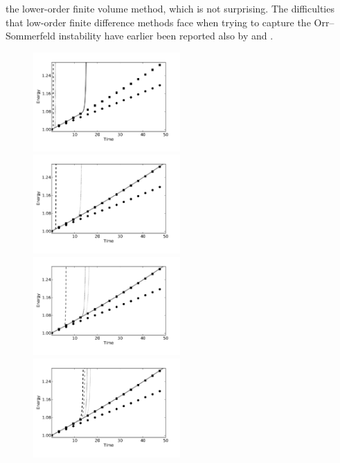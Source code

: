 the lower-order finite volume method, which is not surprising. The
difficulties that low-order finite difference methods face when trying
to capture the Orr--Sommerfeld instability have earlier been reported
also by \citet{MalikZangHussaini1984} and \citet{CanutoHussainiQuarteroniEtAl2007}.
\begin{figure}
\includegraphics[width=0.5\textwidth]{chapters/mortensen/pdf/OS_energy_cfl_0_1_model_1.pdf}
\includegraphics[width=0.5\textwidth]{chapters/mortensen/pdf/OS_energy_cfl_0_1_model_0.pdf}
\includegraphics[width=0.5\textwidth]{chapters/mortensen/pdf/OS_energy_cfl_0_05_model_1.pdf}
\includegraphics[width=0.5\textwidth]{chapters/mortensen/pdf/OS_energy_cfl_0_05_model_0.pdf}

\end{figure}

